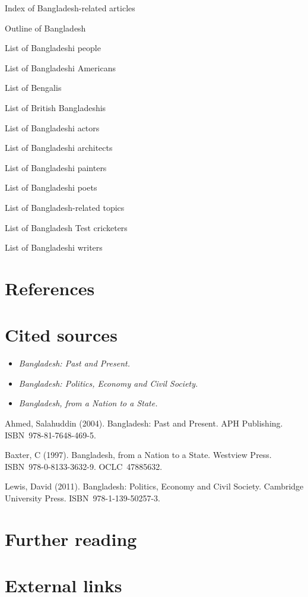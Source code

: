 Index of Bangladesh-related articles

Outline of Bangladesh

List of Bangladeshi people

List of Bangladeshi Americans

List of Bengalis

List of British Bangladeshis

List of Bangladeshi actors

List of Bangladeshi architects

List of Bangladeshi painters

List of Bangladeshi poets

List of Bangladesh-related topics

List of Bangladesh Test cricketers

List of Bangladeshi writers

\section{References}\label{references}

\section{Cited sources}\label{cited-sources}

\begin{itemize}
\item
  \emph{Bangladesh: Past and Present.}
\item
  \emph{Bangladesh: Politics, Economy and Civil Society.}
\item
  \emph{Bangladesh, from a Nation to a State.}
\end{itemize}

Ahmed, Salahuddin (2004). Bangladesh: Past and Present. APH Publishing.
ISBN~978-81-7648-469-5.

Baxter, C (1997). Bangladesh, from a Nation to a State. Westview Press.
ISBN~978-0-8133-3632-9. OCLC~47885632.

Lewis, David (2011). Bangladesh: Politics, Economy and Civil Society.
Cambridge University Press. ISBN~978-1-139-50257-3.

\section{Further reading}\label{further-reading}

\section{External links}\label{external-links}


